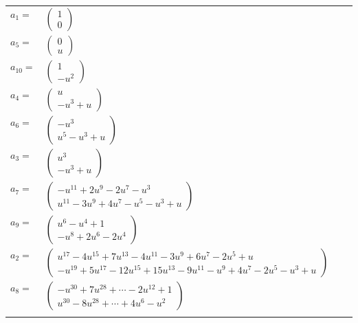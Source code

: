 \documentclass[1p]{elsarticle_modified}
\theoremstyle{definition}
\begin{document}
\begin{tabular}{m{7pt} m{180pt} m{7pt} m{180pt} }
\flushright $a_{1}=$&$\begin{pmatrix}1\\0\end{pmatrix}$ \\
\flushright $a_{5}=$&$\begin{pmatrix}0\\u\end{pmatrix}$ \\
\flushright $a_{10}=$&$\begin{pmatrix}1\\- u^2\end{pmatrix}$ \\
\flushright $a_{4}=$&$\begin{pmatrix}u\\- u^3+u\end{pmatrix}$ \\
\flushright $a_{6}=$&$\begin{pmatrix}- u^3\\u^5- u^3+u\end{pmatrix}$ \\
\flushright $a_{3}=$&$\begin{pmatrix}u^3\\- u^3+u\end{pmatrix}$ \\
\flushright $a_{7}=$&$\begin{pmatrix}- u^{11}+2 u^9-2 u^7- u^3\\u^{11}-3 u^9+4 u^7- u^5- u^3+u\end{pmatrix}$ \\
\flushright $a_{9}=$&$\begin{pmatrix}u^6- u^4+1\\- u^8+2 u^6-2 u^4\end{pmatrix}$ \\
\flushright $a_{2}=$&$\begin{pmatrix}u^{17}-4 u^{15}+7 u^{13}-4 u^{11}-3 u^9+6 u^7-2 u^5+u\\- u^{19}+5 u^{17}-12 u^{15}+15 u^{13}-9 u^{11}- u^9+4 u^7-2 u^5- u^3+u\end{pmatrix}$ \\
\flushright $a_{8}=$&$\begin{pmatrix}- u^{30}+7 u^{28}+\cdots-2 u^{12}+1\\u^{30}-8 u^{28}+\cdots+4 u^6- u^2\end{pmatrix}$\\&\end{tabular}
\end{document}
